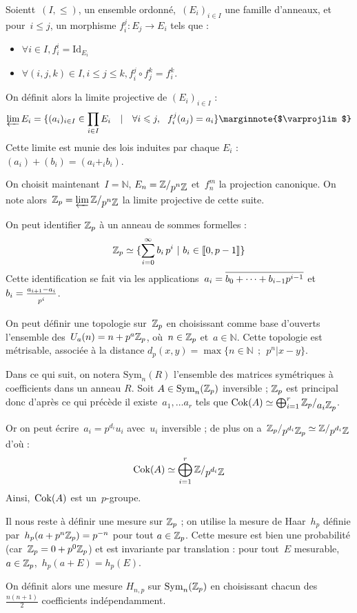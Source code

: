 \begin{defi}
Soientt~$(I, \leq)$, un ensemble ordonné,~$(E_i)_{i\in I}$ une famille d'anneaux, et pour~$i\leq j$, un morphisme $f_i^j : E_j \to E_i$ tels que :
\begin{itemize}
\item $\forall i\in I, f_i^i = \text{Id}_{E_i}$
\item $\forall (i,j,k)\in I, i\leq j\leq k, f_i^j \circ f_j^k = f_i^k$.
\end{itemize}
On définit alors la limite projective de $(E_i)_{i\in I}$ :
\[ \varprojlim{E_i} = \{(a_i)_{i\in I}\in \prod_{i\in I}{E_i}\quad |\quad\forall i\leq j,\ \  f_i^j(a_j) = a_i \} \text{\marginnote{$\varprojlim$}} \]
Cette limite est munie des lois induites par chaque $E_i$ : $(a_i) + (b_i) = (a_i +_i b_i)$.
\end{defi}

On choisit maintenant~$I = \mathbb N$, $E_n = \quotient{\mathbb{Z}}{p^n \mathbb Z}$ et~$f_n^m$ la projection canonique. On note alors~$\Zp = \varprojlim{\quotient{\mathbb Z}{p^n\mathbb Z}}$ la limite projective de cette suite. \marginnote{$\Zp$}

\begin{rem}
On peut identifier $\Zp$ à un anneau de sommes formelles :
\[ \mathbb{Z}_p \simeq \{ \sum_{i=0}^\infty{b_i\,p^i}\   |\  b_i\in\llbracket0, p-1 \rrbracket\} \]
Cette identification se fait via les applications~$a_i = \overline{\strut b_0+\dots+b_{i-1}p^{i-1}}$ et~$b_i = \frac{a_{i+1}-a_i}{\strut p^i}$.
\end{rem}

On peut définir une topologie sur~$\Zp$ en choisissant comme base d'ouverts l'ensemble des~$U_a(n) = n + p^a\mathbb{Z}_p$, où~$n\in\mathbb{Z}_p$ et~$a\in\mathbb N$. Cette topologie est métrisable, associée à la distance $d_p(x,y) = \max\{n\in\mathbb N \ \ ;\  \ p^n | x-y\}$.

\vspace{0.2cm}
Dans ce qui suit, on notera $\text{Sym}_n(R)$ l'ensemble des matrices symétriques à coefficients dans un anneau $R$.
Soit $A \in \operatorname{Sym}_n(\mathbb{Z}_p)$ inversible ; $\Zp$ est principal donc d'après ce qui précède il existe~$a_1, \dots a_r$ tels que $\Cok(A) \simeq \bigoplus_{i=1}^r{\quotient{\Zp}{a_i\Zp}}$.

Or on peut écrire~$a_i = p^{d_i}u_i$ avec~$u_i$ inversible ; de plus on a~$\quotient{\Zp}{p^{d_i}\Zp} \simeq \quotient{\mathbb Z}{p^{d_i}\mathbb Z}$ d'où :
\[ \Cok(A) \simeq \bigoplus_{i=1}^r \quotient{\mathbb Z}{p^{d_i}\mathbb Z} \]
Ainsi,~$\operatorname{Cok}(A)$ est un~$p$-groupe.

Il nous reste à définir une mesure sur $\Zp$ ; on utilise la mesure de Haar~$h_p$ définie par~$h_p(a+p^n\mathbb{Z}_p) = p^{-n}$ pour tout $a\in\mathbb{Z}_p$.
Cette mesure est bien une probabilité (car~$\mathbb{Z}_p = 0+p^0\mathbb{Z}_p$) et est invariante par translation : pour tout~$E$ mesurable,~$a\in\mathbb{Z}_p$,~$h_p(a+E)=h_p(E)$.

On définit alors une mesure $H_{n,p}$ sur $\operatorname{Sym}_n(\mathbb{Z}_p)$ en choisissant chacun des $\frac{n(n+1)}2$ coefficients indépendamment.
